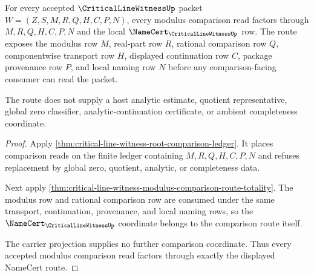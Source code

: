 \begin{theorem}
\label{thm:critical-line-witness-modulus-comparison-namecert-route}
For every accepted $\CriticalLineWitnessUp$ packet $W=(Z,S,M,R,Q,H,C,P,N)$, every modulus comparison read factors through $M,R,Q,H,C,P,N$ and the local $\NameCert_{\CriticalLineWitnessUp}$ row. The route exposes the modulus row $M$, real-part row $R$, rational comparison row $Q$, componentwise transport row $H$, displayed continuation row $C$, package provenance row $P$, and local naming row $N$ before any comparison-facing consumer can read the packet.

The route does not supply a host analytic estimate, quotient representative, global zero classifier, analytic-continuation certificate, or ambient completeness coordinate.
\end{theorem}
\begin{proof}
Apply \autoref{thm:critical-line-witness-root-comparison-ledger}. It places comparison reads on the finite ledger containing $M,R,Q,H,C,P,N$ and refuses replacement by global zero, quotient, analytic, or completeness data.

Next apply \autoref{thm:critical-line-witness-modulus-comparison-route-totality}. The modulus row and rational comparison row are consumed under the same transport, continuation, provenance, and local naming rows, so the $\NameCert_{\CriticalLineWitnessUp}$ coordinate belongs to the comparison route itself.

The carrier projection supplies no further comparison coordinate. Thus every accepted modulus comparison read factors through exactly the displayed NameCert route.
\end{proof}

